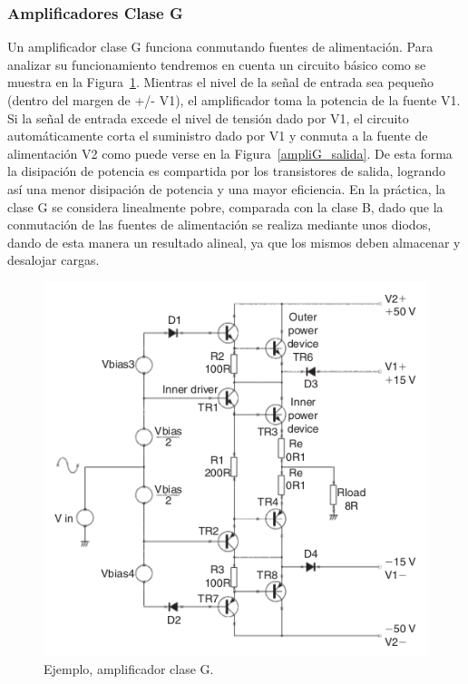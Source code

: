 \medskip 
\subsubsection*{Amplificadores Clase G}


Un amplificador clase G funciona conmutando fuentes de alimentación. Para analizar su funcionamiento tendremos en cuenta un circuito básico como se muestra en la Figura~\ref{ampliG}. Mientras el nivel de la señal de entrada sea pequeño (dentro del margen de +/- V1), el amplificador toma la potencia de la fuente V1. Si la señal de entrada excede el nivel de tensión dado por V1, el circuito automáticamente corta el suministro dado por V1 y conmuta a la fuente de alimentación V2 como puede verse en la Figura~\ref{ampliG_salida}. De esta forma la disipación de potencia es compartida por los transistores de salida, logrando así una menor disipación de potencia y una mayor eficiencia.
En la práctica, la clase G se considera linealmente pobre, comparada con la clase B, dado que la conmutación de las fuentes de alimentación se realiza mediante unos diodos, dando de esta manera un resultado alineal, ya que los mismos deben almacenar y desalojar cargas.
 
\begin{figure}[H]
 \centering
 \includegraphics[scale=0.55]{img/ampliG.png}
 \caption{Ejemplo, amplificador clase G.}
 \label{ampliG} 
 \end{figure}
  
